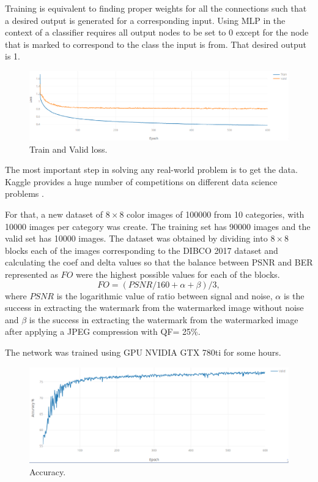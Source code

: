\documentclass[runningheads]{llncs}
\begin{document}
Training is equivalent to finding proper weights for all the connections such that a desired output is generated for a corresponding input. Using MLP in the context of a classifier requires all output nodes to be set to 0 except for the node that is marked to correspond to the class the input is from. That desired output is 1.

\begin{figure}
	\begin{center}
		\includegraphics[width=\textwidth]{loss.eps}
		\caption{Train and Valid loss.} \label{loss}
	\end{center}
\end{figure} 

The most important step in solving any real-world problem is to get the data. Kaggle provides a huge number of competitions on different data science problems \cite{Subramanian2018}.

For that, a new dataset of $8\times 8$ color images of 100000 from 10 categories, with 10000 images per category was create. The training set has 90000 images and the valid set has 10000 images. The dataset was obtained by dividing into $8\times 8$ blocks each of the images corresponding to the DIBCO 2017 dataset and calculating the coef and delta values so that the balance between PSNR and BER represented as $FO$ were the highest possible values for each of the blocks.
\begin{equation}
FO = (PSNR/160 + \alpha + \beta)/3,
\label{FA}
\end{equation}
where $PSNR$ is the logarithmic value of ratio between signal and noise, $ \alpha $ is the success in extracting the watermark from the watermarked image without noise and $ \beta $ is the success in extracting the watermark from the watermarked image after applying a JPEG compression with QF= 25{\%}.

The network was trained using GPU NVIDIA GTX 780ti for some hours.
\begin{figure}
\begin{center}
	\includegraphics[width=\textwidth]{acc.eps}
	\caption{Accuracy.} \label{acc}
\end{center}
\end{figure}
\end{document}
